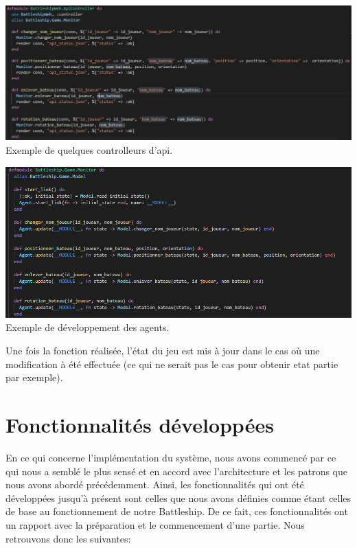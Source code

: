 \documentclass[12pt]{article}
\begin{document}
\begin{center}
\includegraphics[scale = 0.5]{implementation-apiController.PNG} \\
Exemple de quelques controlleurs d'api.\cite{data_oriented_design}
\\[1.0 cm]
\end{center}

\begin{center}
\includegraphics[scale = 0.5]{implementation-agents.PNG} \\
Exemple de développement des agents.\cite{data_oriented_design}
\\[1.0 cm]
\end{center}

Une fois la fonction réalisée, l'état du jeu est mis à jour dans le cas où une modification à été effectuée (ce qui ne serait pas le cas pour obtenir etat partie par exemple).

\section{Fonctionnalités développées}

En ce qui concerne l'implémentation du système, nous avons commencé par ce qui nous a semblé le plus sensé et en accord avec l'architecture et les patrons que nous avons abordé précédemment. Ainsi, les fonctionnalités qui ont été développées jusqu'à présent sont celles que nous avons définies comme étant celles de base au fonctionnement de notre Battleship. De ce fait, ces fonctionnalités ont un rapport avec la préparation et le commencement d'une partie. Nous retrouvons donc les suivantes:
\end{document}
